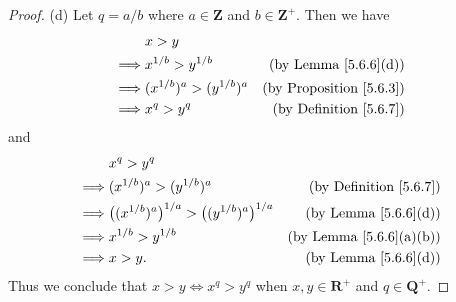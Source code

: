 \begin{proof}{(d)}
    Let \(q = a / b\) where \(a \in \mathbf{Z}\) and \(b \in \mathbf{Z}^+\).
    Then we have
    \begin{align*}
                 & x > y                                                               \\
        \implies & x^{1 / b} > y^{1 / b}         & \text{(by Lemma \ref{5.6.6}(d))}    \\
        \implies & (x^{1 / b})^a > (y^{1 / b})^a & \text{(by Proposition \ref{5.6.3})} \\
        \implies & x^q > y^q                     & \text{(by Definition \ref{5.6.7})}
    \end{align*}
    and
    \begin{align*}
                 & x^q > y^q                                                                                               \\
        \implies & (x^{1 / b})^a > (y^{1 / b})^a                                     & \text{(by Definition \ref{5.6.7})}  \\
        \implies & \big((x^{1 / b})^a\big)^{1 / a} > \big((y^{1 / b})^a\big)^{1 / a} & \text{(by Lemma \ref{5.6.6}(d))}    \\
        \implies & x^{1 / b} > y^{1 / b}                                             & \text{(by Lemma \ref{5.6.6}(a)(b))} \\
        \implies & x > y.                                                            & \text{(by Lemma \ref{5.6.6}(d))}
    \end{align*}
    Thus we conclude that \(x > y \iff x^q > y^q\) when \(x, y \in \mathbf{R}^+\) and \(q \in \mathbf{Q}^+\).
\end{proof}

